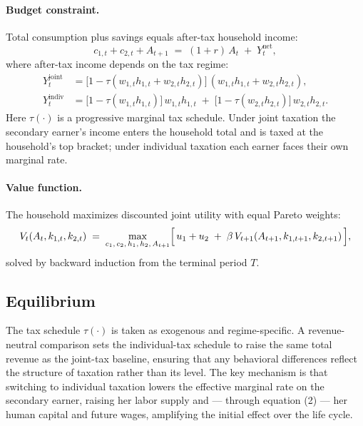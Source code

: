 \paragraph{Budget constraint.} Total consumption plus savings equals after-tax household income:
\begin{equation}
    c_{1,t} + c_{2,t} + A_{t+1} \;=\; (1+r)\,A_t \;+\; Y^{\text{net}}_t,
\end{equation}
where after-tax income depends on the tax regime:
\begin{align}
    Y^{\text{joint}}_t  &= \bigl[1 - \tau(w_{1,t}h_{1,t} + w_{2,t}h_{2,t})\bigr]\,(w_{1,t}h_{1,t} + w_{2,t}h_{2,t}), \\
    Y^{\text{indiv}}_t  &= \bigl[1-\tau(w_{1,t}h_{1,t})\bigr]\,w_{1,t}h_{1,t} \;+\; \bigl[1-\tau(w_{2,t}h_{2,t})\bigr]\,w_{2,t}h_{2,t}.
\end{align}
Here $\tau(\cdot)$ is a progressive marginal tax schedule.
Under joint taxation the secondary earner's income enters the household total and is taxed at the household's top bracket; under individual taxation each earner faces their own marginal rate.

\paragraph{Value function.} The household maximizes discounted joint utility with equal Pareto weights:
\begin{equation}
    V_t(A_t, k_{1,t}, k_{2,t}) \;=\; \max_{c_1,\, c_2,\, h_1,\, h_2,\, A_{t+1}}
    \Bigl[\, u_1 + u_2 \;+\; \beta\, V_{t+1}(A_{t+1}, k_{1,t+1}, k_{2,t+1}) \,\Bigr],
\end{equation}
solved by backward induction from the terminal period $T$.

\subsection{Equilibrium}

The tax schedule $\tau(\cdot)$ is taken as exogenous and regime-specific.
A revenue-neutral comparison sets the individual-tax schedule to raise the same total revenue as the joint-tax baseline, ensuring that any behavioral differences reflect the structure of taxation rather than its level.
The key mechanism is that switching to individual taxation lowers the effective marginal rate on the secondary earner, raising her labor supply and — through equation (2) — her human capital and future wages, amplifying the initial effect over the life cycle.
